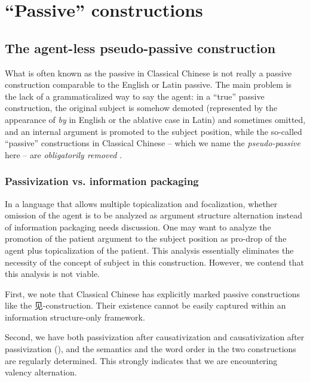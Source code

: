 \documentclass[UTF8, a4paper, oneside, scheme=plain, 12pt]{ctexrep}
\newcommand*{\citepage}[1]{p.~{#1}}
\newcommand*{\term}[1]{\emph{#1}}
\newcommand{\form}[1]{\emph{#1}}
\begin{document}
\section{``Passive'' constructions}\label{sec:grammatical.clause.verbal.argument-structure.passive}

\subsection{The agent-less pseudo-passive construction}\label{sec:grammatical.clause.verbal.argument-structure.pseudo-passive}

What is often known as the passive in Classical Chinese is not really a passive construction
comparable to the English or Latin passive.
The main problem is the lack of a grammaticalized way to say the agent:
in a ``true'' passive construction, the original subject is somehow demoted
(represented by the appearance of \form{by} in English or the ablative case in Latin)
and sometimes omitted, and an internal argument is promoted to the subject position,
while the so-called ``passive'' constructions in Classical Chinese
-- which we name the \term{pseudo-passive} here --
are \emph{obligatorily removed} \citep[\citepage{287-289}]{meiguang2018}.

\subsubsection{Passivization vs. information packaging}\label{sec:grammatical.clause.verbal.argument-structure.pseudo-passive.information-packaging}

In a language that allows multiple topicalization and focalization,
whether omission of the agent is to be analyzed as argument structure alternation
instead of information packaging needs discussion.
One may want to analyze the promotion of the patient argument to the subject position 
as pro-drop of the agent plus topicalization of the patient.
This analysis essentially eliminates the necessity of the concept of subject in this construction.
However, we contend that this analysis is not viable.

First, we note that Classical Chinese has explicitly marked passive constructions like the 见-construction.
Their existence cannot be easily captured within an information structure-only framework.

Second, we have both passivization after causativization and causativization after passivization (),
and the semantics and the word order in the two constructions are regularly determined.
This strongly indicates that we are encountering valency alternation.
\end{document}
